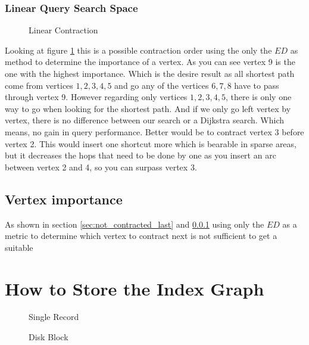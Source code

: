 \subsubsection{Linear Query Search Space}\label{sec:linear_query}

\begin{figure}
\centering

\caption{Linear Contraction}
\label{fig:linear_contraction}
\end{figure}

Looking at figure \ref{fig:linear_contraction} this is a possible contraction order using the only the $ED$ as method to determine the importance of a vertex. As you can see vertex 9 is the one with the highest importance. Which is the desire result as all shortest path come from vertices ${1, 2, 3, 4, 5}$ and go any of the vertices ${6, 7, 8}$ have to pass through vertex 9. However regarding only vertices $1, 2, 3, 4, 5$, there is only one way to go when looking for the shortest path. And if we only go left vertex by vertex, there is no difference between our search or a Dijkstra search. Which means, no gain in query performance. Better would be to contract vertex 3 before vertex 2. This would insert one shortcut more which is bearable in sparse areas, but it decreases the hops that need to be done by one as you insert an arc between vertex 2 and 4, so you can surpass vertex 3. 

\subsection{Vertex importance}\label{sec:vertex_importance}

As shown in section \ref{sec:not_contracted_last} and \ref{sec:linear_query} using only the $ED$ as a metric to determine which vertex to contract next is not sufficient to get a suitable


\section{How to Store the Index Graph}

\begin{figure}
    \centering
    
    \caption{Single Record}
    \label{fig:singleRecord}
\end{figure}

\begin{figure}
    \centering
    
    \caption{Disk Block}
    \label{fig:disk_block}
\end{figure}
